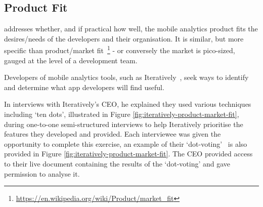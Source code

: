\subsection{Product Fit}
 addresses whether, and if practical how well, the mobile analytics product fits the desires/needs of the developers and their organisation. It is similar, but more specific than product/market fit~\footnote{\url{https://en.wikipedia.org/wiki/Product/market_fit}} - or conversely the market is pico-sized, gauged at the level of a development team. %

Developers of mobile analytics tools, such as Iteratively~, seek ways to identify and determine what app developers will find useful. 

In interviews with Iteratively's CEO, he explained they used various techniques including `ten dots', illustrated in Figure \ref{fig:iteratively-product-market-fit}, during one-to-one semi-structured interviews to help Iteratively prioritise the features they developed and provided. Each interviewee was given the opportunity to complete this exercise, an example of their `dot-voting'~ is also provided in Figure \ref{fig:iteratively-product-market-fit}.
The CEO provided access to their live document containing the results of the `dot-voting' and gave permission to analyse it.%


